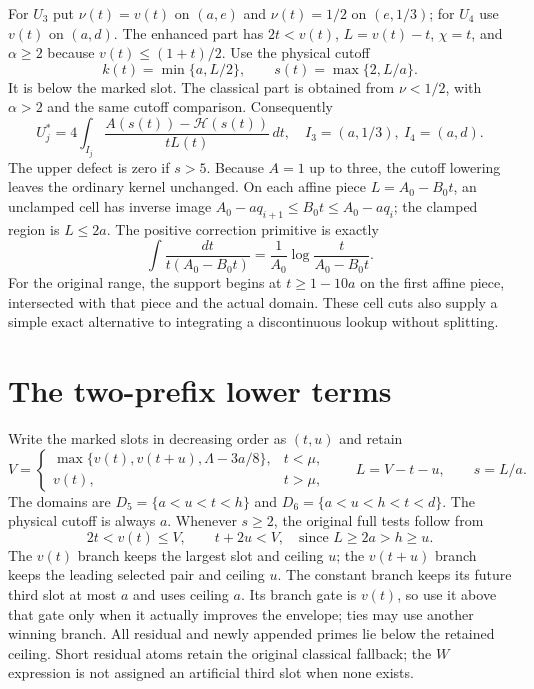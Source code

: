 \documentclass[11pt]{article}
\newcommand{\HH}{\mathcal H}
\newcommand{\Lam}{\Lambda}
\begin{document}
For $U_3$ put $\nu(t)=v(t)$ on $(a,e)$ and $\nu(t)=1/2$ on
$(e,1/3)$; for $U_4$ use $v(t)$ on $(a,d)$. The enhanced part has
$2t<v(t)$, $L=v(t)-t$, $\chi=t$, and $\alpha\ge2$ because
$v(t)\le(1+t)/2$. Use the physical cutoff
\[
 k(t)=\min\{a,L/2\},\qquad s(t)=\max\{2,L/a\}.
\]
It is below the marked slot. The classical part is obtained from
$\nu<1/2$, with $\alpha>2$ and the same cutoff comparison.
Consequently
\begin{equation}\label{eq:U34}
 U_j^*=4\int_{I_j}\frac{A(s(t))-\HH(s(t))}{tL(t)}\,dt,
 \quad I_3=(a,1/3),\ I_4=(a,d).
\end{equation}
The upper defect is zero if $s>5$. Because $A=1$ up to three,
the cutoff lowering leaves the ordinary kernel unchanged.
On each affine piece $L=A_0-B_0t$, an unclamped cell has inverse
image $A_0-aq_{i+1}\le B_0t\le A_0-aq_i$; the clamped region is
$L\le2a$. The positive correction primitive is exactly
\[
 \int\frac{dt}{t(A_0-B_0t)}
 =\frac1{A_0}\log\frac{t}{A_0-B_0t}.
\]
For the original range, the support begins at $t\ge1-10a$ on the
first affine piece, intersected with that piece and the actual domain.
These cell cuts also supply a simple exact alternative to integrating
a discontinuous lookup without splitting.

\section*{The two-prefix lower terms}
Write the marked slots in decreasing order as $(t,u)$ and retain
\[
 V=\begin{cases}
 \max\{v(t),v(t+u),\Lam-3a/8\},&t<\mu,\\
 v(t),&t>\mu,
 \end{cases}\qquad L=V-t-u,\qquad s=L/a.
\]
The domains are $D_5=\{a<u<t<h\}$ and
$D_6=\{a<u<h<t<d\}$. The physical cutoff is always $a$.
Whenever $s\ge2$, the original full tests follow from
\[
 2t<v(t)\le V,\qquad t+2u<V,
 \quad\text{since }L\ge2a>h\ge u.
\]
The $v(t)$ branch keeps the largest slot and ceiling $u$;
the $v(t+u)$ branch keeps the leading selected pair and ceiling $u$.
The constant branch keeps its future third slot at most $a$ and
uses ceiling $a$. Its branch gate is $v(t)$, so use it above that
gate only when it actually improves the envelope; ties may use
another winning branch. All residual and newly appended primes lie
below the retained ceiling. Short residual atoms retain the original
classical fallback; the $W$ expression is not assigned an artificial
third slot when none exists.
\end{document}
